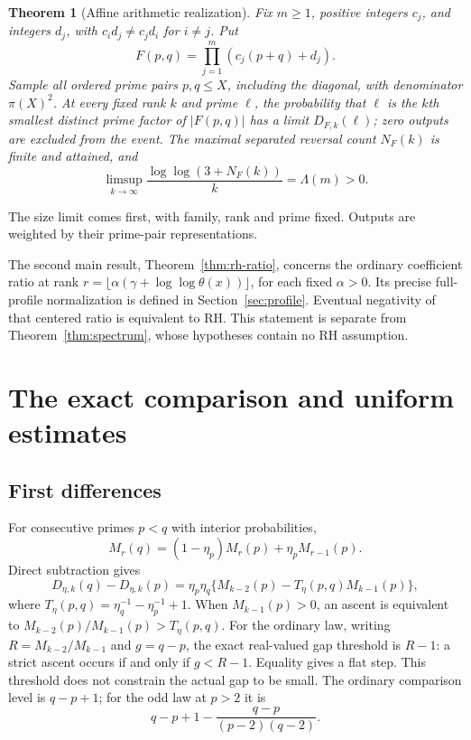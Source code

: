 \documentclass[11pt]{article}
\newtheorem{theorem}{Theorem}[section]
\theoremstyle{definition}
\begin{document}
\begin{theorem}[Affine arithmetic realization]\label{thm:affine}
Fix $m\ge1$, positive integers $c_j$, and integers $d_j$, with
$c_id_j\ne c_jd_i$ for $i\ne j$. Put
\[
 F(p,q)=\prod_{j=1}^m(c_j(p+q)+d_j).
\]
Sample all ordered prime pairs $p,q\le X$, including the diagonal,
with denominator $\pi(X)^2$. At every fixed rank $k$ and prime
$\ell$, the probability that $\ell$ is the $k$th smallest distinct
prime factor of $|F(p,q)|$ has a limit $D_{F,k}(\ell)$; zero
outputs are excluded from the event. The maximal separated reversal
count $N_F(k)$ is finite and attained, and
\[
 \limsup_{k\to\infty}\frac{\log\log(3+N_F(k))}{k}=\Lambda(m)>0.
\]
\end{theorem}
The size limit comes first, with family, rank and prime fixed.
Outputs are weighted by their prime-pair representations.

The second main result, Theorem~\ref{thm:rh-ratio}, concerns the
ordinary coefficient ratio at rank
$r=\lfloor\alpha(\gamma+\log\log\theta(x))\rfloor$, for each fixed
$\alpha>0$. Its precise full-profile normalization is defined in
Section~\ref{sec:profile}. Eventual negativity of that centered ratio
is equivalent to RH. This statement is separate from
Theorem~\ref{thm:spectrum}, whose hypotheses contain no RH assumption.

\section{The exact comparison and uniform estimates}\label{sec:ratio}
\subsection{First differences}
For consecutive primes $p<q$ with interior probabilities,
\[
 M_r(q)=(1-\eta_p)M_r(p)+\eta_pM_{r-1}(p).
\]
Direct subtraction gives
\begin{equation}\label{eq:diff}
 D_{\eta,k}(q)-D_{\eta,k}(p)=
 \eta_p\eta_q\{M_{k-2}(p)-T_\eta(p,q)M_{k-1}(p)\},
\end{equation}
where $T_\eta(p,q)=\eta_q^{-1}-\eta_p^{-1}+1$.
When $M_{k-1}(p)>0$, an ascent is equivalent to
$M_{k-2}(p)/M_{k-1}(p)>T_\eta(p,q)$.
For the ordinary law, writing $R=M_{k-2}/M_{k-1}$ and $g=q-p$,
the exact real-valued gap threshold is $R-1$: a strict ascent occurs
if and only if $g<R-1$. Equality gives a flat step.
This threshold does not constrain the actual gap to be small.
The ordinary comparison level is $q-p+1$; for the odd law at $p>2$ it is
\[
 q-p+1-\frac{q-p}{(p-2)(q-2)}.
\]
\end{document}
